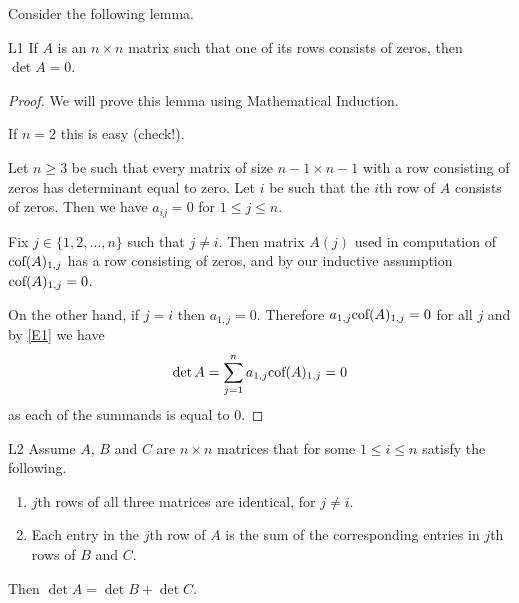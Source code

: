Consider the following lemma.

\begin{lemma}{}{L1} 
If $A$ is an $n\times n$ matrix such that one of its rows consists of zeros, then 
$\det A=0$. 
\end{lemma} 

\begin{proof} 
We will prove this lemma using Mathematical Induction. 

If $n=2$ this is easy (check!). 

Let $n\geq 3$ be such that every matrix of size $n-1\times n-1$ with a row consisting of zeros
has determinant equal to zero.  
Let $i$ be such that the $i$th row of $A$ consists of zeros. 
Then we have $a_{ij}=0$ for $1\leq j\leq n$. 

Fix $j\in \{1,2, \dots ,n\}$ such that $j\neq i$. Then  matrix $A(j)$ used in computation of
 $\mbox{cof}(A)_{1,j}$ has a row consisting of zeros, and by our inductive 
 assumption $\mbox{cof}(A)_{1,j}=0$. 

On the other hand, if $j=i$ then $a_{1,j}=0$.  
Therefore $a_{1,j}\mbox{cof}(A)_{1,j}=0$ for all $j$ and by \eqref{E1} we have 
\[
\det A=\sum_{j=1}^n a_{1,j} \mbox{cof}(A)_{1,j}=0
\]
as each of the summands is equal to 0. 
\end{proof} 

\begin{lemma}{}{L2} 
Assume $A$, $B$ and $C$ are $n\times n$ matrices that for some 
 $1\leq i\leq n$ satisfy the following. 
\begin{enumerate}
\item $j$th rows of all three matrices are identical, for $j\neq i$. 

\item Each entry in the $j$th row of $A$ is the sum of the corresponding 
entries in $j$th rows of $B$ and $C$. 
\end{enumerate}

Then $\det A=\det B+\det C$. 
\end{lemma} 

